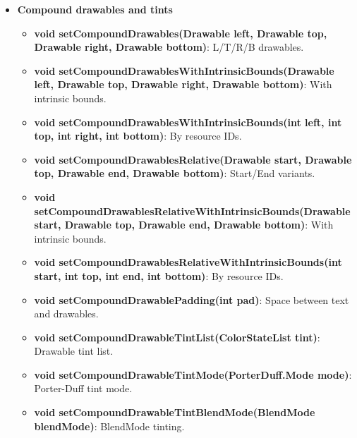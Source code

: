 \documentclass{report}
\begin{document}
\begin{itemize}
\begin{itemize}
        \item \textbf{Compound drawables and tints}
            \begin{itemize}
                \item \textbf{void setCompoundDrawables(Drawable left, Drawable top, Drawable right, Drawable bottom)}: L/T/R/B drawables.
                \item \textbf{void setCompoundDrawablesWithIntrinsicBounds(Drawable left, Drawable top, Drawable right, Drawable bottom)}: With intrinsic bounds.
                \item \textbf{void setCompoundDrawablesWithIntrinsicBounds(int left, int top, int right, int bottom)}: By resource IDs.
                \item \textbf{void setCompoundDrawablesRelative(Drawable start, Drawable top, Drawable end, Drawable bottom)}: Start/End variants.
                \item \textbf{void setCompoundDrawablesRelativeWithIntrinsicBounds(Drawable start, Drawable top, Drawable end, Drawable bottom)}: With intrinsic bounds.
                \item \textbf{void setCompoundDrawablesRelativeWithIntrinsicBounds(int start, int top, int end, int bottom)}: By resource IDs.
                \item \textbf{void setCompoundDrawablePadding(int pad)}: Space between text and drawables.
                \item \textbf{void setCompoundDrawableTintList(ColorStateList tint)}: Drawable tint list.
                \item \textbf{void setCompoundDrawableTintMode(PorterDuff.Mode mode)}: Porter-Duff tint mode.
                \item \textbf{void setCompoundDrawableTintBlendMode(BlendMode blendMode)}: BlendMode tinting.
            \end{itemize}


\end{itemize}
\end{itemize}
\end{document}
